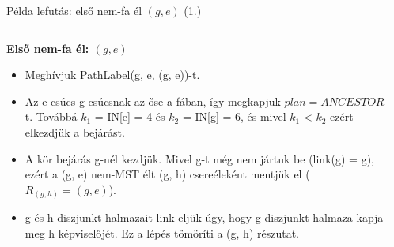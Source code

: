 \begin{frame}{Példa lefutás: első nem-fa él $(g, e)$ (1.)}
\begin{columns}[T]
  \begin{column}{0.46\textwidth}
    \small
    \textbf{Első nem-fa él: $(g, e)$}
    \begin{itemize}
      \item Meghívjuk PathLabel(g, e, (g, e))-t.
      \item Az e csúcs g csúcsnak az őse a fában, így megkapjuk $plan = ANCESTOR$-t. Továbbá $k_1$ = IN[e] = 4 és $k_2$ = IN[g] = 6, és mivel $k_1$ < $k_2$ ezért elkezdjük a bejárást.
      
      \item A kör bejárás g-nél kezdjük. Mivel g-t még nem jártuk be (link(g) = g), ezért a (g, e) nem-MST élt (g, h) csereéleként mentjük el ($R_{(g, h)} = (g, e)$).
      \item g és h diszjunkt halmazait link-eljük úgy, hogy g diszjunkt halmaza kapja meg h képviselőjét. Ez a lépés tömöríti a (g, h) részutat.
    \end{itemize}
  \end{column}
  \begin{column}{0.54\textwidth}
    \centering
    \begin{tikzpicture}[
      scale=1,
      vtx/.style={circle, draw=black, fill=white, inner sep=1pt, minimum size=16pt},
      mstedge/.style={line width=2.5pt, draw=black},
      otheredge/.style={line width=0.8pt, draw=black},
      font=\small
    ]


\end{tikzpicture}
\end{column}
\end{columns}
\end{frame}
